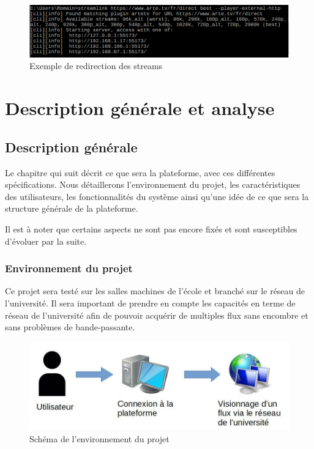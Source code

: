\documentclass{polytech/polytech}
\begin{document}
\begin{figure}
	\includegraphics[scale=0.5]{images/streamlinkHttp.png}
	\caption{Exemple de redirection des streams}
	\label{fig:redir_streamlink}
\end{figure}

\part{Description générale et analyse}


\chapter{Description générale}
\label{chap:description}

Le chapitre qui suit décrit ce que sera la plateforme, avec ces différentes spécifications. Nous détaillerons l’environnement du projet, les caractéristiques des utilisateurs, les fonctionnalités du système ainsi qu’une idée de ce que sera la structure générale de la plateforme.

Il est à noter que certains aspects ne sont pas encore fixés et sont susceptibles d’évoluer par la suite.

\section{Environnement du projet}

Ce projet sera testé sur les salles machines de l’école et branché sur le réseau de l’université. Il sera important de prendre en compte les capacités en terme de réseau de l’université afin de pouvoir acquérir de multiples flux sans encombre et sans problèmes de bande-passante.

\begin{figure}
	\includegraphics[scale=0.75]{images/environnement}
	\caption{Schéma de l'environnement du projet}
	\label{fig:environnement}
\end{figure}
\end{document}
